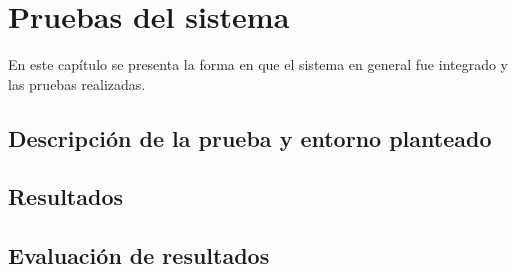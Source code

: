 \chapter{Pruebas del sistema}
\label{chap:SystemTest}

En este capítulo se presenta la forma en que el sistema en general fue integrado y las pruebas realizadas.

\section{Descripción de la prueba y entorno planteado}
\label{sec:TestDescription}

\section{Resultados}
\label{sec:TestResults}

\section{Evaluación de resultados}
\label{sec:TestEval}
